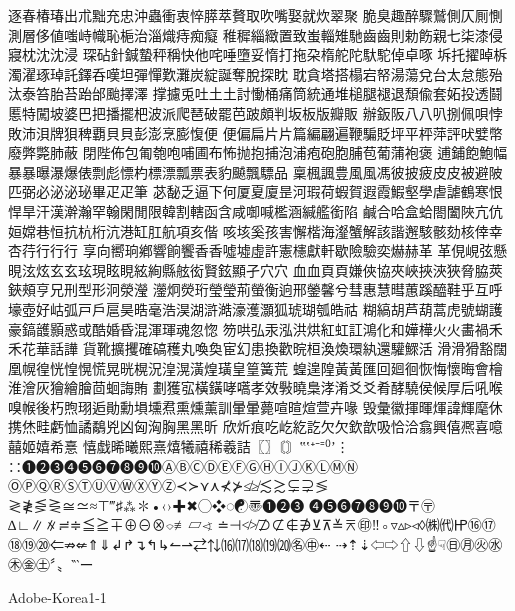 逐春椿瑃出朮黜充忠沖蟲衝衷悴膵萃贅取吹嘴娶就炊翠聚
脆臭趣醉驟鷲側仄厠惻測層侈値嗤峙幟恥梔治淄熾痔痴癡
稚穉緇緻置致蚩輜雉馳⿒齒則勅飭親七柒漆侵寢枕沈沈浸
琛砧針鍼蟄秤稱快他咤唾墮妥惰打拖朶楕舵陀馱駝倬卓啄
坼托擢晫柝濁濯琢琸託鐸呑嘆坦彈憚歎灘炭綻誕奪脫探眈
耽貪塔搭榻宕帑湯蕩兌台太怠態殆汰泰笞胎苔跆邰颱擇澤
撑攄兎吐⼟土討慟桶痛筒統通堆槌腿褪退頹偸套妬投透鬪
慝特闖坡婆巴把播擺杷波派爬琶破罷芭跛頗判坂板版瓣販
辦鈑阪⼋八叭捌佩唄悖敗沛浿牌狽稗覇⾙貝彭澎烹膨愎便
便偏扁⽚片篇編翩遍鞭騙貶坪平枰萍評吠嬖幣廢弊斃肺蔽
閉陛佈包匍匏咆哺圃布怖抛抱捕泡浦疱砲胞脯苞葡蒲袍褒
逋鋪飽鮑幅暴暴曝瀑爆俵剽彪慓杓標漂瓢票表豹飇飄驃品
稟楓諷豊⾵風馮彼披疲⽪皮被避陂匹弼必泌泌珌畢⽦疋筆
苾馝乏逼下何厦夏廈昰河瑕荷蝦賀遐霞鰕壑學虐謔鶴寒恨
悍旱汗漢澣瀚罕翰閑閒限韓割轄函含咸啣喊檻涵緘艦銜陷
鹹合哈盒蛤閤闔陜亢伉姮嫦巷恒抗杭桁沆港缸肛航項亥偕
咳垓奚孩害懈楷海瀣蟹解該諧邂駭骸劾核倖幸杏荇⾏行行
享向嚮珦鄕響餉饗⾹香噓墟虛許憲櫶獻軒歇險驗奕爀赫⾰
革俔峴弦懸晛泫炫⽞玄玹現眩睍絃絢縣舷衒賢鉉顯孑⽳穴
⾎血⾴頁嫌俠協夾峽挾浹狹脅脇莢鋏頰亨兄刑型形泂滎瀅
灐炯熒珩瑩瑩荊螢衡逈邢鎣馨兮彗惠慧暳蕙蹊醯鞋乎互呼
壕壺好岵弧⼾戶扈昊晧毫浩淏湖滸澔濠濩灝狐琥瑚瓠皓祜
糊縞胡芦葫蒿虎號蝴護豪鎬頀顥惑或酷婚昏混渾琿魂忽惚
笏哄弘汞泓洪烘紅虹訌鴻化和嬅樺⽕火畵禍⽲禾花華話譁
貨靴擴攫確碻穫丸喚奐宦幻患換歡晥桓渙煥環紈還驩鰥活
滑滑猾豁闊凰幌徨恍惶愰慌晃晄榥況湟滉潢煌璜皇篁簧荒
蝗遑隍⿈黃匯回廻徊恢悔懷晦會檜淮澮灰獪繪膾茴蛔誨賄
劃獲宖橫鐄哮嚆孝效斅曉梟涍淆⽘爻肴酵驍侯候厚后吼喉
嗅帿後朽煦珝逅勛勳塤壎焄熏燻薰訓暈暈薨喧暄煊萱卉喙
毁彙徽揮暉煇諱輝麾休携烋畦虧恤譎鷸兇凶匈洶胸⿊黑昕
欣炘痕吃屹紇訖⽋欠欽歆吸恰洽翕興僖凞喜噫囍姬嬉希憙
憘戱晞曦熙熹熺犧禧稀羲詰〖〗〘〙‟‛⁺⁻⁼⁽⁾ʼ⋮
∷➊➋➌➍➎➏➐➑➒➓ⒶⒷⒸⒹⒺⒻⒼⒽⒾⒿⓀⓁⓂⓃ
ⓄⓅⓆⓇⓈⓉⓊⓋⓌⓍⓎⓏ≺≻⋎⋏⊀⊁≰≱≲≳⊊⊋≶
≷≹⋚⋛≅≃≈⊤‴♯⁂✽•‹›✚✖◯❖◌☯〠❶❷❸
❹❺❻❼❽❾❿〒〶∆∟∥∦≓≑≦≧∓⊕⊖⊗⌔≢▱∢
≐⊣≮≯⊅⊄∉∌⊻⊼≚⌆㊞‼◦▿▵▹◃◊㈱㈹㏋⑯⑰
⑱⑲⑳⇐⇏⇍⇑⇓↲↱↴↰↳↼⇀⇄⇅⒃⒄⒅⒆⒇㊔㊥⇠
⇢⇡⇣⇦⇨⇧⇩☝☟㊐㊊㊋㊌㊍㊎㊏〞〟‶‵ー

Adobe-Korea1-1

